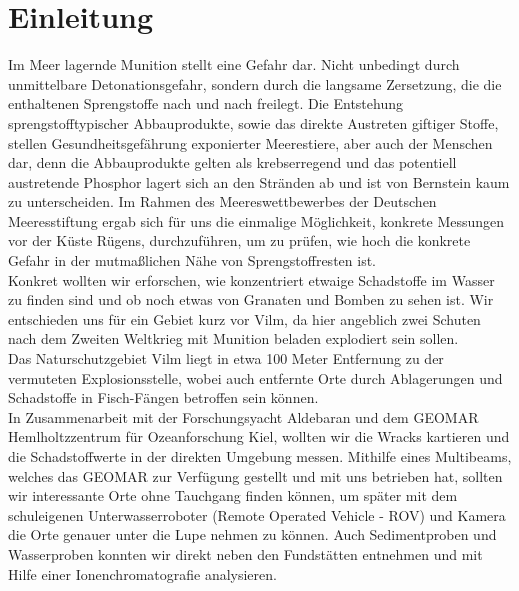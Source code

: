  

\chapter[Einleitung]{Einleitung}

Im Meer lagernde Munition stellt eine Gefahr dar. Nicht unbedingt durch unmittelbare Detonationsgefahr, 
sondern durch die langsame Zersetzung, die die enthaltenen Sprengstoffe nach und nach 
freilegt\cite{zeitbomben}. Die Entstehung sprengstofftypischer Abbauprodukte, sowie das direkte Austreten 
giftiger Stoffe, stellen Gesundheitsgefährung exponierter Meerestiere, aber auch der Menschen dar\cite{spread}, denn die
Abbauprodukte gelten als krebserregend und das potentiell austretende Phosphor lagert sich an den Stränden 
ab und ist von Bernstein kaum zu unterscheiden.  Im Rahmen des Meereswettbewerbes der Deutschen Meeresstiftung ergab sich für uns die einmalige Möglichkeit, konkrete Messungen vor der Küste Rügens, durchzuführen, um zu prüfen, wie hoch die konkrete Gefahr in der mutmaßlichen Nähe von Sprengstoffresten ist.\\

Konkret wollten wir erforschen, wie konzentriert etwaige Schadstoffe im Wasser zu finden sind und 
ob noch etwas von Granaten und Bomben zu sehen ist. Wir entschieden uns für ein Gebiet kurz vor Vilm,
da hier angeblich zwei Schuten nach dem Zweiten Weltkrieg mit Munition beladen explodiert sein sollen.\cite{schiffsschicksale}\\

Das Naturschutzgebiet Vilm liegt in etwa 100 Meter Entfernung zu der vermuteten Explosionsstelle, wobei auch 
entfernte Orte durch Ablagerungen und Schadstoffe in Fisch-Fängen betroffen sein können.\\

In Zusammenarbeit mit der Forschungsyacht Aldebaran und dem GEOMAR Hemlholtzzentrum für Ozeanforschung Kiel, wollten wir die Wracks kartieren und die Schadstoffwerte in
der direkten Umgebung messen. 
Mithilfe eines 
\glqq Multibeams\grqq, welches das GEOMAR zur Verfügung gestellt und mit uns betrieben hat, sollten wir interessante Orte ohne Tauchgang finden können, um später mit dem schuleigenen Unterwasserroboter (Remote Operated Vehicle - ROV)  und Kamera die Orte genauer unter die Lupe nehmen zu können. Auch Sedimentproben und Wasserproben konnten wir direkt neben den Fundstätten entnehmen und mit Hilfe einer Ionenchromatografie analysieren.\\

